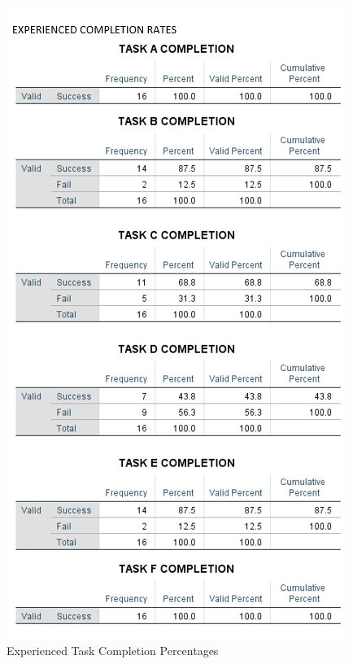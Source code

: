 \begin{figure}[H]
\includegraphics[]{Screenshots/UXResearchDataFiles/UXTaskCompletionData/experiencedPercentageCompletion.png}
\caption{Experienced Task Completion Percentages}	
\end{figure}



